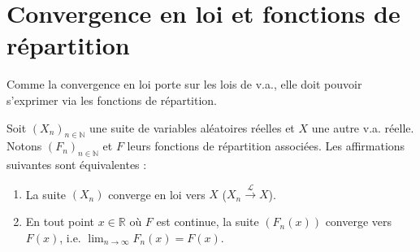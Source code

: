 \section{Convergence en loi et fonctions de répartition}
Comme la convergence en loi porte sur les lois de v.a., elle doit pouvoir s'exprimer via les fonctions de répartition.
\begin{theorem}
Soit $(X_n)_{n \in \mathbb{N}}$ une suite de variables aléatoires réelles et $X$ une autre v.a. réelle. Notons $(F_n)_{n \in \mathbb{N}}$ et $F$ leurs fonctions de répartition associées. Les affirmations suivantes sont équivalentes :
\begin{enumerate}
    \item[i)] La suite $(X_n)$ converge en loi vers $X$ ($X_n \xrightarrow{\mathcal{L}} X$).
    \item[ii)] En tout point $x \in \mathbb{R}$ où $F$ est continue, la suite $(F_n(x))$ converge vers $F(x)$, i.e. $\lim_{n \to \infty} F_n(x) = F(x)$.
\end{enumerate}
\end{theorem}
